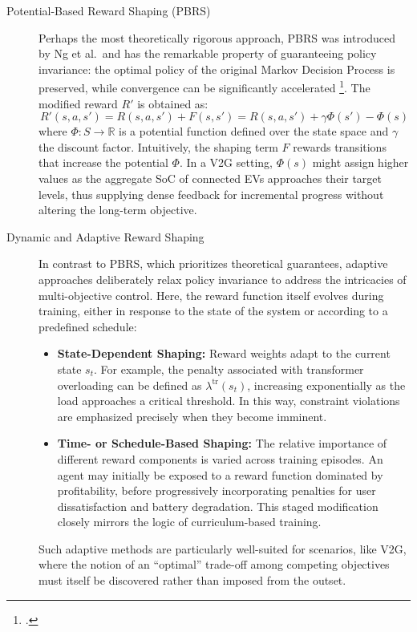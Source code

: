 \begin{description}
    \item[Potential-Based Reward Shaping (PBRS)] 
    \noindent
    Perhaps the most theoretically rigorous approach, PBRS was introduced by Ng et al.\ and has the remarkable property of guaranteeing policy invariance: the optimal policy of the original Markov Decision Process is preserved, while convergence can be significantly accelerated \footcite{ng1999policy}. 
    The modified reward $R'$ is obtained as:
    \begin{equation}
        R'(s, a, s') = R(s, a, s') + F(s, s') = R(s, a, s') + \gamma \Phi(s') - \Phi(s)
    \end{equation}
    where $\Phi: S \to \mathbb{R}$ is a potential function defined over the state space and $\gamma$ the discount factor. 
    Intuitively, the shaping term $F$ rewards transitions that increase the potential $\Phi$. 
    In a V2G setting, $\Phi(s)$ might assign higher values as the aggregate SoC of connected EVs approaches their target levels, thus supplying dense feedback for incremental progress without altering the long-term objective. 

    \item[Dynamic and Adaptive Reward Shaping] 
    \noindent
    In contrast to PBRS, which prioritizes theoretical guarantees, adaptive approaches deliberately relax policy invariance to address the intricacies of multi-objective control. 
    Here, the reward function itself evolves during training, either in response to the state of the system or according to a predefined schedule:
    \begin{itemize}
        \item \textbf{State-Dependent Shaping:} Reward weights adapt to the current state $s_t$. For example, the penalty associated with transformer overloading can be defined as $\lambda^{\text{tr}}(s_t)$, increasing exponentially as the load approaches a critical threshold. In this way, constraint violations are emphasized precisely when they become imminent. 
        \item \textbf{Time- or Schedule-Based Shaping:} The relative importance of different reward components is varied across training episodes. An agent may initially be exposed to a reward function dominated by profitability, before progressively incorporating penalties for user dissatisfaction and battery degradation. This staged modification closely mirrors the logic of curriculum-based training. 
    \end{itemize}
    Such adaptive methods are particularly well-suited for scenarios, like V2G, where the notion of an “optimal” trade-off among competing objectives must itself be discovered rather than imposed from the outset. 


\end{description}
